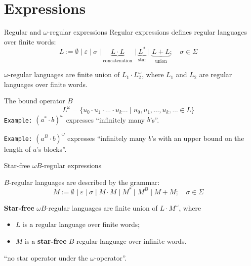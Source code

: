 \documentclass[svgnames]{beamer}
\newcommand{\set}[1]{\{ #1 \}}
\begin{document}
\section{Expressions}

\begin{frame}{Regular and $\omega$-regular expressions}
Regular expressions defines regular languages over finite words:
$$L := \emptyset \mid \varepsilon \mid \sigma 
\mid \underbrace{L \cdot L}_{\textrm{concatenation}}
\mid \underbrace{L^*}_{\textrm{star}} 
\mid \underbrace{L + L}_{\textrm{union}}; 
\quad \sigma \in \Sigma$$

$\omega$-regular languages are finite union of $L_1 \cdot L_2^\omega$,
where $L_1$ and $L_2$ are regular languages over finite words.
\end{frame}

\begin{frame}{The bound operator $B$~\cite{BC06}}
$$L^\omega = \set{u_0 \cdot u_1 \cdot \ldots \cdot u_k \ldots \mid u_0, u_1, \ldots, 
u_k,\ldots \in L}$$
\pause
\texttt{Example:} $(a^* \cdot b)^\omega$ expresses ``infinitely many $b$'s''.
\pause

\texttt{Example:} $(a^B \cdot b)^\omega$ expresses 
``infinitely many $b$'s with an upper bound on the length of $a$'s blocks''.
\end{frame}

\begin{frame}{Star-free $\omega B$-regular expressions}

$B$-regular languages are described by the grammar:
$$M := \emptyset \mid \varepsilon \mid \sigma \mid M \cdot M \mid 
M^* \mid M^B \mid M + M; \quad \sigma \in \Sigma$$


\pause
\textbf{Star-free} $\omega B$-regular languages are finite union of 
$L \cdot M^\omega$, 
where 
\begin{itemize}
 \item $L$ is a regular language over finite words;
 \item $M$ is a \textbf{star-free} $B$-regular language over infinite words.
\end{itemize}
``no star operator under the $\omega$-operator''.

\end{frame}
\end{document}
